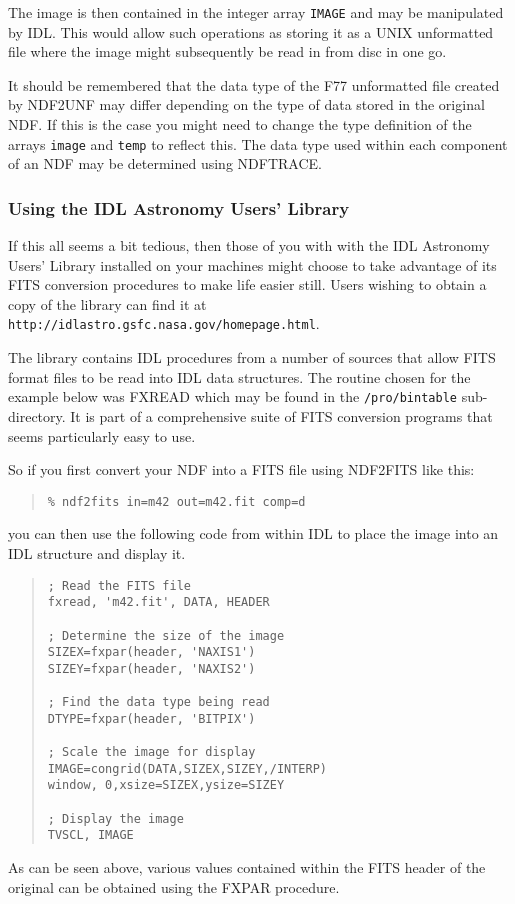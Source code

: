 \documentclass[twoside,11pt]{article}
\newcommand{\htmladdnormallink}[2]{#1}
\newcommand{\htmlref}[2]{#1}
\newcommand{\xref}[3]{#1}
\newcommand{\IDLAULURL}{http://idlastro.gsfc.nasa.gov/homepage.html}
\begin{document}
The image is then contained in the integer array \texttt{IMAGE} and may be 
manipulated by IDL. This would allow such operations as storing it as 
a UNIX unformatted file where the image might subsequently be read in 
from disc in one go.

It should be remembered that the data type of the F77 unformatted
file created by NDF2UNF may differ depending on the type of data stored 
in the original NDF. If this is the case you might need to change the 
type definition of the arrays \texttt{image} and \texttt{temp} to reflect this. 
The data type used within each component of an NDF may be determined using 
\xref{NDFTRACE}{sun95}{NDFTRACE}. 


\subsubsection{Using the IDL Astronomy Users' Library}

If this all seems a bit tedious, then those of you with with the IDL 
Astronomy Users' Library installed on your machines might choose to 
take advantage of its FITS conversion procedures to make life easier 
still. Users wishing to obtain a copy of the library can find it at 
\htmladdnormallink{\texttt{\IDLAULURL}}{\IDLAULURL}.

The library contains IDL procedures from a number of sources that allow FITS 
format files to be read into IDL data structures. The routine chosen for the
example below was FXREAD which may be found in the \texttt{/pro/bintable} 
sub-directory. It is part of a comprehensive suite of FITS conversion programs
that seems particularly easy to use.

So if you first convert your NDF into a FITS file using
\htmlref{NDF2FITS}{NDF2FITS} like this:

\begin{quote} \begin{verbatim}
% ndf2fits in=m42 out=m42.fit comp=d
\end{verbatim} \end{quote}
you can then use the following code from within IDL to place the image
into an IDL structure and display it. 

\begin{quote} \begin{verbatim}
; Read the FITS file 
fxread, 'm42.fit', DATA, HEADER
 
; Determine the size of the image
SIZEX=fxpar(header, 'NAXIS1')
SIZEY=fxpar(header, 'NAXIS2')
 
; Find the data type being read
DTYPE=fxpar(header, 'BITPIX')
 
; Scale the image for display
IMAGE=congrid(DATA,SIZEX,SIZEY,/INTERP)
window, 0,xsize=SIZEX,ysize=SIZEY
 
; Display the image
TVSCL, IMAGE
\end{verbatim} \end{quote}
As can be seen above, various values contained within the FITS header 
of the original can be obtained using the FXPAR procedure. 
\end{document}
